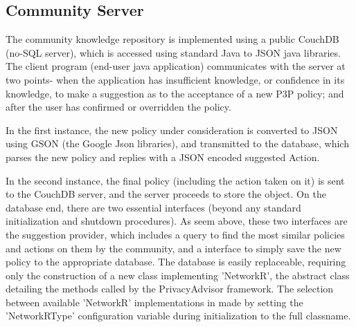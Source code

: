 \subsection{Community Server}
The community knowledge repository is implemented using a public CouchDB (no-SQL server), which is accessed using standard Java to JSON java libraries. The client program (end-user java application) communicates with the server at two points- when the application has insufficient knowledge, or confidence in its knowledge, to make a suggestion as to the acceptance of a new P3P policy; and after the user has confirmed or overridden the policy.

In the first instance, the new policy under consideration is converted to JSON using GSON (the Google Json libraries), and transmitted to the database, which parses the new policy and replies with a JSON encoded suggested Action.

In the second instance, the final policy (including the action taken on it) is sent to the CouchDB server, and the server proceeds to store the object.
On the database end, there are two essential interfaces (beyond any standard initialization and shutdown procedures). As seem above, these two interfaces are the suggestion provider, which includes a query to find the most similar policies and actions on them by the community, and a interface to simply save the new policy to the appropriate database.
The database is easily replaceable, requiring only the construction of a new class implementing 'NetworkR', the abstract class detailing the methods called by the PrivacyAdvisor framework. The selection between available 'NetworkR' implementations in made by setting the 'NetworkRType' configuration variable during initialization to the full classname.
